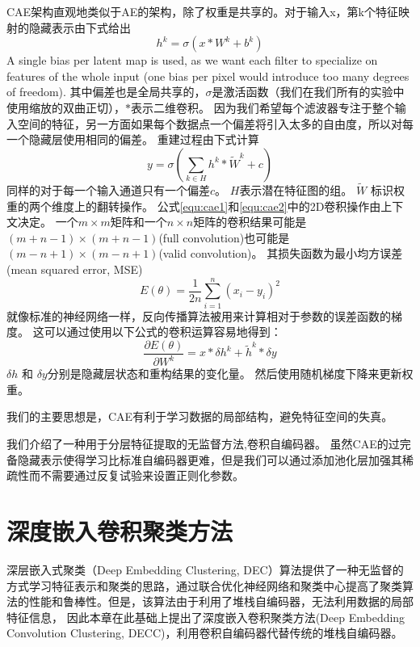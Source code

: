 CAE架构直观地类似于AE的架构，除了权重是共享的。对于输入x，第k个特征映射的隐藏表示由下式给出
\begin{equation}
	h^k=\sigma(x*W^k+b^k)
	\label{equ:cae1}
\end{equation}
A single bias per latent map is used, as we want each filter to specialize on features of the whole input (one bias per pixel would introduce too many degrees of freedom).
其中偏差也是全局共享的，$\sigma$是激活函数（我们在我们所有的实验中使用缩放的双曲正切），$*$表示二维卷积。
因为我们希望每个滤波器专注于整个输入空间的特征，另一方面如果每个数据点一个偏差将引入太多的自由度，所以对每一个隐藏层使用相同的偏差。
重建过程由下式计算
\begin{equation}
	y=\sigma(\sum_{k \in H}h^k * \tilde{W}^k + c)
	\label{equ:cae2}
\end{equation}
同样的对于每一个输入通道只有一个偏差$c$。 $H$表示潜在特征图的组。
$\tilde{W}$ 标识权重的两个维度上的翻转操作。
公式\ref{equ:cae1}和\ref{equ:cae2}中的2D卷积操作由上下文决定。
一个$m\times m$矩阵和一个$n\times n$矩阵的卷积结果可能是$(m+n− 1) \times (m + n − 1)$(full convolution)也可能是$(m − n + 1) \times  (m − n + 1)$(valid convolution)。
其损失函数为最小均方误差(mean squared error, MSE)
\begin{equation}
	E(\theta) = \frac{1}{2n}\sum_{i=1}^n(x_i-y_i)^2
\end{equation}
就像标准的神经网络一样，反向传播算法被用来计算相对于参数的误差函数的梯度。 这可以通过使用以下公式的卷积运算容易地得到：
\begin{equation}
	\frac{\partial E(\theta)}{\partial W^k}=x * \delta h ^k+\tilde{h}^k * \delta y
\end{equation}
$\delta h$ 和 $\delta y$分别是隐藏层状态和重构结果的变化量。 然后使用随机梯度下降来更新权重。

我们的主要思想是，CAE有利于学习数据的局部结构，避免特征空间的失真。

我们介绍了一种用于分层特征提取的无监督方法,卷积自编码器。
虽然CAE的过完备隐藏表示使得学习比标准自编码器更难，但是我们可以通过添加池化层加强其稀疏性而不需要通过反复试验来设置正则化参数。

\section{深度嵌入卷积聚类方法}
深层嵌入式聚类（Deep Embedding Clustering, DEC）\cite{xie2016unsupervised}算法提供了一种无监督的方式学习特征表示和聚类的思路，通过联合优化神经网络和聚类中心提高了聚类算法的性能和鲁棒性。但是，该算法由于利用了堆栈自编码器，无法利用数据的局部特征信息，
因此本章在此基础上提出了深度嵌入卷积聚类方法(Deep Embedding Convolution Clustering, DECC)，利用卷积自编码器代替传统的堆栈自编码器。
